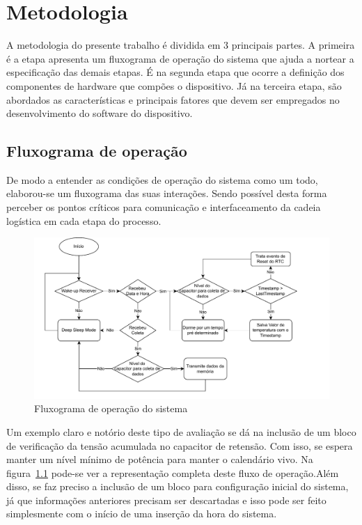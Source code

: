 \chapter{Metodologia}
A metodologia do presente trabalho é dividida em 3 principais partes. A primeira é a etapa apresenta um fluxograma de operação do sistema que ajuda a nortear a especificação das demais etapas. É na segunda etapa que ocorre a definição dos componentes de hardware que compões o dispositivo. Já na terceira etapa, são abordados as características e principais fatores que devem ser empregados no desenvolvimento do software do dispositivo.



\section{Fluxograma de operação}
De modo a entender as condições de operação do sistema como um todo, elaborou-se um fluxograma das suas interações. Sendo possível desta forma perceber os pontos críticos para comunicação e interfaceamento da cadeia logística em cada etapa do processo.
\begin{figure}
  \caption{Fluxograma de operação do sistema}
  \begin{center}
      \includegraphics[scale=0.7]{img/fluxogramaOperacao.drawio.pdf}
  \end{center}
  \label{fig:fluxo}
\end{figure}

Um exemplo claro e notório deste tipo de avaliação se dá na inclusão de um bloco de verificação da tensão acumulada no capacitor de retensão. Com isso, se espera manter um nível mínimo de potência para manter o calendário vivo.
Na figura~\ref{fig:fluxo} pode-se ver a representação completa deste fluxo de operação.Além disso, se faz preciso a inclusão de um bloco para configuração inicial do sistema, já que informações anteriores precisam ser descartadas e isso pode ser feito simplesmente com o início de uma inserção da hora do sistema.


